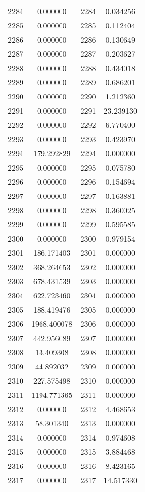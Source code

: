 \documentclass[12pt]{article}
\begin{document}
\begin{longtable}{@{}cccc@{}}
2284 & 0.000000 & 2284 & 0.034256 \\
2285 & 0.000000 & 2285 & 0.112404 \\
2286 & 0.000000 & 2286 & 0.130649 \\
2287 & 0.000000 & 2287 & 0.203627 \\
2288 & 0.000000 & 2288 & 0.434018 \\
2289 & 0.000000 & 2289 & 0.686201 \\
2290 & 0.000000 & 2290 & 1.212360 \\
2291 & 0.000000 & 2291 & 23.239130 \\
2292 & 0.000000 & 2292 & 6.770400 \\
2293 & 0.000000 & 2293 & 0.423970 \\
2294 & 179.292829 & 2294 & 0.000000 \\
2295 & 0.000000 & 2295 & 0.075780 \\
2296 & 0.000000 & 2296 & 0.154694 \\
2297 & 0.000000 & 2297 & 0.163881 \\
2298 & 0.000000 & 2298 & 0.360025 \\
2299 & 0.000000 & 2299 & 0.595585 \\
2300 & 0.000000 & 2300 & 0.979154 \\
2301 & 186.171403 & 2301 & 0.000000 \\
2302 & 368.264653 & 2302 & 0.000000 \\
2303 & 678.431539 & 2303 & 0.000000 \\
2304 & 622.723460 & 2304 & 0.000000 \\
2305 & 188.419476 & 2305 & 0.000000 \\
2306 & 1968.400078 & 2306 & 0.000000 \\
2307 & 442.956089 & 2307 & 0.000000 \\
2308 & 13.409308 & 2308 & 0.000000 \\
2309 & 44.892032 & 2309 & 0.000000 \\
2310 & 227.575498 & 2310 & 0.000000 \\
2311 & 1194.771365 & 2311 & 0.000000 \\
2312 & 0.000000 & 2312 & 4.468653 \\
2313 & 58.301340 & 2313 & 0.000000 \\
2314 & 0.000000 & 2314 & 0.974608 \\
2315 & 0.000000 & 2315 & 3.884468 \\
2316 & 0.000000 & 2316 & 8.423165 \\
2317 & 0.000000 & 2317 & 14.517330 \\

\end{longtable}
\end{document}
